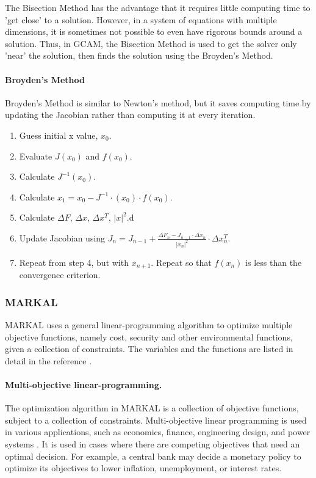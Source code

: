 The Bisection Method has the advantage that it requires little computing time
to 'get close' to a solution. However, in a system of equations with multiple
dimensions, it is sometimes not possible to even have rigorous bounds around 
a solution. Thus, in \gls{GCAM}, the Bisection Method is used to get the 
solver only 'near' the solution, then finds the solution using the Broyden's Method.

\paragraph{Broyden's Method}
Broyden's Method is similar to Newton's method, but it saves computing 
time by updating the Jacobian rather than computing it at every iteration. 

\begin{enumerate}
\item Guess initial x value, $x_0$.
\item Evaluate $J(x_0)$ and $f(x_0)$.
\item Calculate $J^{-1}(x_0).$
\item Calculate $x_1 = x_0-J^{-1} \cdot (x_0) \cdot f(x_0)$.
\item Calculate $\Delta F$, $\Delta x$, $\Delta x^T$, $|x|^2$.d
\item Update Jacobian using $J_n = J_{n-1}+ \frac{\Delta F_n - J_{n-1} \cdot \Delta
	 x_n}{|x_n|^2} \cdot \Delta x_n^T $.
\item Repeat from step 4, but with $x_{n+1}$. Repeat so that $f(x_n)$ is less than the 
convergence criterion.
\end{enumerate}

\subsubsection{\gls{MARKAL}}

\gls{MARKAL} uses a general linear-programming algorithm to 
optimize multiple objective functions, namely cost, security and
other environmental functions, given a collection of constraints.
The variables and the functions are listed in detail in the reference
\cite{fishbone_markal_1981} \cite{abilock_users_1979}. 


\paragraph{Multi-objective linear-programming.}
The optimization algorithm in \gls{MARKAL} is a collection
of objective functions, subject to a collection of constraints.
Multi-objective linear programming is used in various applications,
such as economics, finance, engineering design, and power systems
\cite{dorfman_linear_1958}.
It is used in cases where there are competing objectives that need
an optimal decision. For example, a central bank may decide a monetary 
policy to optimize its objectives to lower inflation, unemployment, 
or interest rates. 
 
